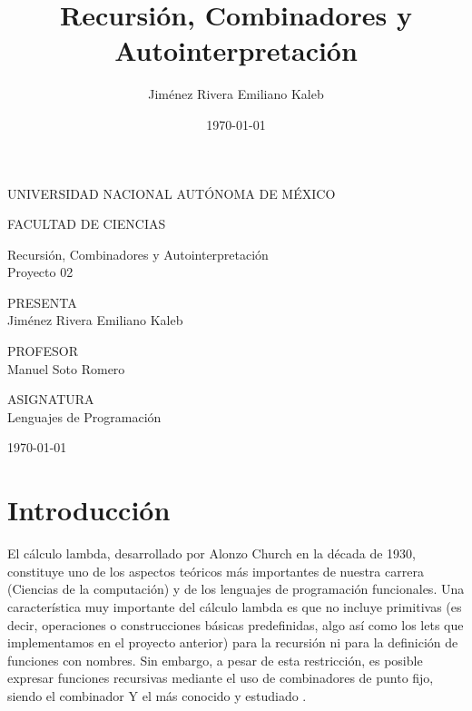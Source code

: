 \documentclass[11pt]{article}
\title{Recursión, Combinadores y Autointerpretación}
\author{Jim\'enez Rivera Emiliano Kaleb}
\date{\today}
\begin{document}
\begin{center}
  \vspace{0.8cm}
  \LARGE
  UNIVERSIDAD NACIONAL AUTÓNOMA DE MÉXICO
  \vspace{0.8cm}

  \LARGE
  FACULTAD DE CIENCIAS
  \vspace{1.7cm}

  \Large
  Recursión, Combinadores y Autointerpretación \\
  \vspace{0.5cm}
  \normalsize
  Proyecto 02
  \vspace{1.3cm}

  \normalsize
  PRESENTA \\
  \vspace{.3cm}
  \large
  Jim\'enez Rivera Emiliano Kaleb
  \vspace{1.3cm}

  \normalsize
  PROFESOR \\
  \vspace{.3cm}
  \large
  Manuel Soto Romero
  \vspace{1.3cm}

  \normalsize
  ASIGNATURA \\
  \vspace{.3cm}
  \large
  Lenguajes de Programaci\'on
  \vspace{1.3cm}

  \today
\end{center}

\newpage

\tableofcontents
\newpage

\section{Introducción}

El cálculo lambda, desarrollado por Alonzo Church en la década de 1930, constituye uno de los aspectos teóricos más importantes de nuestra carrera (Ciencias de la computación) y de los lenguajes de programación funcionales. Una característica muy importante del cálculo lambda es que no incluye primitivas (es decir, operaciones o construcciones básicas predefinidas, algo as\'i como los lets que implementamos en el proyecto anterior) para la recursión ni para la definición de funciones con nombres. Sin embargo, a pesar de esta restricci\'on, es posible expresar funciones recursivas mediante el uso de combinadores de punto fijo, siendo el combinador Y el más conocido y estudiado \cite{curry1958}.
\end{document}
